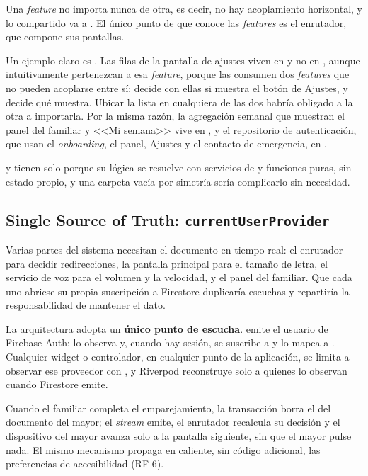 Una \emph{feature} no importa nunca de otra, es decir, no hay acoplamiento horizontal, y lo compartido va a . El único punto de  que conoce las \emph{features} es el enrutador, que compone sus pantallas.

Un ejemplo claro es . Las filas de la pantalla de ajustes viven en  y no en , aunque intuitivamente pertenezcan a esa \emph{feature}, porque las consumen dos \emph{features} que no pueden acoplarse entre sí:  decide con ellas si muestra el botón de Ajustes, y  decide qué muestra. Ubicar la lista en cualquiera de las dos habría obligado a la otra a importarla. Por la misma razón, la agregación semanal que muestran el panel del familiar y <<Mi semana>> vive en , y el repositorio de autenticación, que usan el \emph{onboarding}, el panel, Ajustes y el contacto de emergencia, en .

 y  tienen solo  porque su lógica se resuelve con servicios de  y funciones puras, sin estado propio, y una carpeta  vacía por simetría sería complicarlo sin necesidad.

\subsection{Single Source of Truth: \texttt{currentUserProvider}}
\label{sec:ssot}

Varias partes del sistema necesitan el documento  en tiempo real: el enrutador para decidir redirecciones, la pantalla principal para el tamaño de letra, el servicio de voz para el volumen y la velocidad, y el panel del familiar. Que cada uno abriese su propia suscripción a Firestore duplicaría escuchas y repartiría la responsabilidad de mantener el dato.

La arquitectura adopta un \textbf{único punto de escucha}.  emite el usuario de Firebase Auth;  lo observa y, cuando hay sesión, se suscribe a  y lo mapea a . Cualquier widget o controlador, en cualquier punto de la aplicación, se limita a observar ese proveedor con , y Riverpod reconstruye solo a quienes lo observan cuando Firestore emite.

Cuando el familiar completa el emparejamiento, la transacción borra el  del documento del mayor; el \emph{stream} emite, el enrutador recalcula su decisión y el dispositivo del mayor avanza solo a la pantalla siguiente, sin que el mayor pulse nada. El mismo mecanismo propaga en caliente, sin código adicional, las preferencias de accesibilidad (RF-6).

